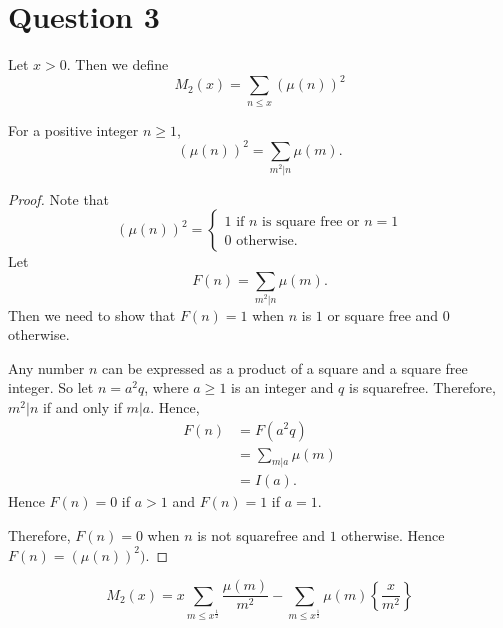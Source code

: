 \documentclass{unswmaths}
\begin{document}
\section*{Question 3}
\begin{unswdef}
    Let $x > 0$. Then we define
    \begin{equation*}
        M_2(x) = \sum_{n\leq x} (\mu(n))^2
    \end{equation*}
\end{unswdef}
\begin{unswlem}
\label{M2Alt}
    For a positive integer $n \geq 1$,
    \begin{equation*}
        (\mu(n))^2 = \sum_{m^2|n} \mu(m).
    \end{equation*}
\end{unswlem}
\begin{proof}
    Note that
    \begin{equation*}
        (\mu(n))^2 = \begin{cases}
            1\text{ if }n\text{ is square free or }n = 1\\
            0\text{ otherwise.}
        \end{cases}
    \end{equation*}
    Let 
    \begin{equation*}
        F(n) = \sum_{m^2|n} \mu(m).
    \end{equation*}
    Then we need to show that $F(n) = 1$ when $n$ is $1$ or square free 
    and $0$ otherwise.
    
    Any number $n$ can be expressed as a product of a square and a square
    free integer. So let $n = a^2q$, where $a \geq 1$ is an integer 
    and $q$ is squarefree. Therefore,  $m^2|n$ if and only if $m|a$. Hence,
    \begin{align*}
        F(n) &= F(a^2q)\\
             &= \sum_{m|a}\mu(m)\\
             &= I(a).
    \end{align*}
    Hence $F(n) = 0$ if $a > 1$ and $F(n) = 1$ if $a = 1$.
    
    Therefore, $F(n) = 0$ when $n$ is not squarefree and $1$ otherwise.
    Hence $F(n) = (\mu(n))^2)$.
\end{proof}
\begin{unswlem}
    \begin{equation*}
        M_2(x) = x\sum_{m\leq x^\frac{1}{2}} \frac{\mu(m)}{m^2}-\sum_{m\leq x^\frac{1}{2}}\mu(m)\left\{\frac{x}{m^2}\right\}
    \end{equation*}
\end{unswlem}
\end{document}

